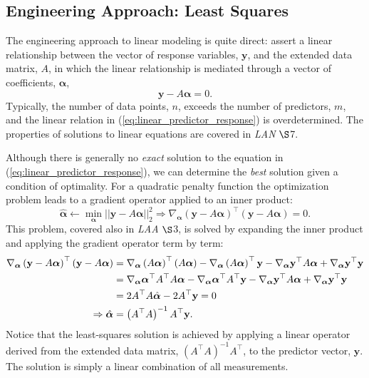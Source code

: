 \documentclass[12pt, twoside, draft]{article}
\begin{document}
\subsection{Engineering Approach: Least Squares}\label{sec:linear_model_engineering}
The engineering approach to linear modeling is quite direct: assert a linear relationship between the vector of response variables, $\mathbf{y}$, and the extended data matrix, $A$, in which the linear relationship is mediated through a vector of coefficients, $\boldsymbol{\alpha}$,
\begin{equation}\label{eq:linear_predictor_response}
\mathbf{y} - A \boldsymbol{\alpha} = 0.
\end{equation}
Typically, the number of data points, $n$, exceeds the number of predictors, $m$, and the linear relation in (\ref{eq:linear_predictor_response}) is overdetermined.  The properties of solutions to linear equations are covered in \textit{LAN} $\S$7.

Although there is generally no \textit{exact} solution to the equation in (\ref{eq:linear_predictor_response}), we can determine the \textit{best} solution given a condition of optimality.  For a quadratic penalty function the optimization problem leads to a gradient operator applied to an inner product:
\begin{equation}\label{eq:least_squares}
\hat{\boldsymbol{\alpha}} \leftarrow \min_{\boldsymbol{\alpha}} || \mathbf{y} - A \boldsymbol{\alpha} ||_2^2 \Rightarrow \nabla_{\boldsymbol{\alpha}} \left( \mathbf{y} - A \boldsymbol{\alpha} \right)^\top\left( \mathbf{y} - A \boldsymbol{\alpha} \right) = 0.
\end{equation}
This problem, covered also in \textit{LAA} $\S$3, is solved by expanding the inner product and applying the gradient operator term by term:
\begin{align}\label{eq:least_squares_details}
\nabla_{\boldsymbol{\alpha}} \left( \mathbf{y} - A \boldsymbol{\alpha} \right)^\top\left( \mathbf{y} - A \boldsymbol{\alpha} \right) & =
\nabla_{\boldsymbol{\alpha}} \left( A \boldsymbol{\alpha} \right)^\top \left( A \boldsymbol{\alpha} \right) - \nabla_{\boldsymbol{\alpha}} \left( A \boldsymbol{\alpha} \right)^\top \mathbf{y} - \nabla_{\boldsymbol{\alpha}} \mathbf{y}^\top A \boldsymbol{\alpha} + \nabla_{\boldsymbol{\alpha}} \mathbf{y}^\top \mathbf{y} \notag \\
& = \nabla_{\boldsymbol{\alpha}} \boldsymbol{\alpha}^\top A^\top A \boldsymbol{\alpha} - \nabla_{\boldsymbol{\alpha}} \boldsymbol{\alpha}^\top A^\top \mathbf{y} - \nabla_{\boldsymbol{\alpha}} \mathbf{y}^\top A \boldsymbol{\alpha} + \nabla_{\boldsymbol{\alpha}} \mathbf{y}^\top \mathbf{y} \notag \\
& = 2 A^\top A \hat{\boldsymbol{\alpha}} - 2 A^\top \mathbf{y} = 0 \notag \\
\Rightarrow \hat{\boldsymbol{\alpha}} &= \left( A^\top A \right)^{-1} A^\top \mathbf{y}.
\end{align}
Notice that the least-squares solution is achieved by applying a linear operator derived from the extended data matrix, $(A^\top A)^{-1} A^\top$, to the predictor vector, $\mathbf{y}$.  The solution is simply a linear combination of all measurements.
\end{document}
